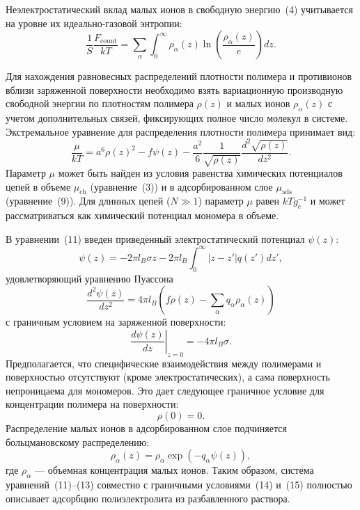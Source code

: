 \documentclass[12pt,a4paper]{article}
\begin{document}
Неэлектростатический вклад малых ионов в свободную энергию~(4) учитывается на уровне их идеально-газовой энтропии:
\begin{equation}
\frac{1}{S}\frac{F_{\text{count}}}{k T} = \sum_\alpha \int_0^\infty \rho_\alpha(z) \ln\left( \frac{\rho_\alpha(z)}{e} \right) dz.
\end{equation}

Для нахождения равновесных распределений плотности полимера и противионов вблизи заряженной поверхности необходимо взять вариационную производную свободной энергии по плотностям полимера $\rho(z)$ и малых ионов $\rho_\alpha(z)$ с учетом дополнительных связей, фиксирующих полное число молекул в системе. Экстремальное уравнение для распределения плотности полимера принимает вид:
\begin{equation}
\frac{\mu}{k T} = a^6 \rho(z)^2 - f \psi(z) - \frac{a^2}{6}\frac{1}{\sqrt{\rho(z)}}\frac{d^2\sqrt{\rho(z)}}{dz^2}.
\end{equation}
Параметр $\mu$ может быть найден из условия равенства химических потенциалов цепей в объеме $\mu_{\text{ch}}$ (уравнение~(3)) и в адсорбированном слое $\mu_{\text{ads}}$ (уравнение~(9)). Для длинных цепей ($N \gg 1$) параметр $\mu$ равен $k T g_e^{-1}$ и может рассматриваться как химический потенциал мономера в объеме.

В уравнении~(11) введен приведенный электростатический потенциал $\psi(z)$:
\begin{equation}
\psi(z) = -2\pi l_B \sigma z - 2\pi l_B \int_0^\infty |z - z'| q(z') dz',
\end{equation}
удовлетворяющий уравнению Пуассона
\begin{equation}
\frac{d^2\psi(z)}{dz^2} = 4\pi l_B \left( f \rho(z) - \sum_\alpha q_\alpha \rho_\alpha(z) \right)
\end{equation}
с граничным условием на заряженной поверхности:
\begin{equation}
\left.\frac{d\psi(z)}{dz}\right|_{z=0} = -4\pi l_B \sigma.
\end{equation}
Предполагается, что специфические взаимодействия между полимерами и поверхностью отсутствуют (кроме электростатических), а сама поверхность непроницаема для мономеров. Это дает следующее граничное условие для концентрации полимера на поверхности:
\begin{equation}
\rho(0) = 0.
\end{equation}
Распределение малых ионов в адсорбированном слое подчиняется больцмановскому распределению:
\begin{equation}
\rho_\alpha(z) = \rho_\alpha \exp(-q_\alpha \psi(z)),
\end{equation}
где $\rho_\alpha$ --- объемная концентрация малых ионов. Таким образом, система уравнений~(11)--(13) совместно с граничными условиями~(14) и~(15) полностью описывает адсорбцию полиэлектролита из разбавленного раствора.
\end{document}
